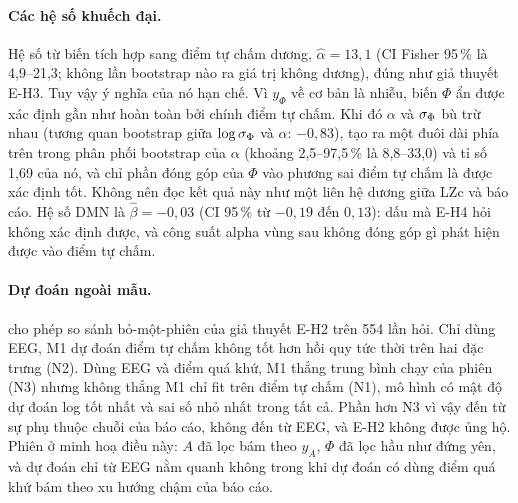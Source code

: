 \paragraph{Các hệ số khuếch đại.} Hệ số từ biến tích hợp sang điểm tự chấm dương, $\hat\alpha=13{,}1$ (CI Fisher 95\,\% là 4,9--21,3; không lần bootstrap nào ra giá trị không dương), đúng như giả thuyết E-H3. Tuy vậy ý nghĩa của nó hạn chế. Vì $y_\Phi$ về cơ bản là nhiễu, biến $\Phi$ ẩn được xác định gần như hoàn toàn bởi chính điểm tự chấm. Khi đó $\alpha$ và $\sigma_{\Phi}$ bù trừ nhau (tương quan bootstrap giữa $\log\sigma_{\Phi}$ và $\alpha$: $-0{,}83$), tạo ra một đuôi dài phía trên trong phân phối bootstrap của $\alpha$ (khoảng 2,5--97,5\,\% là 8,8--33,0) và tỉ số 1,69 của nó, và chỉ phần đóng góp của $\Phi$ vào phương sai điểm tự chấm là được xác định tốt. Không nên đọc kết quả này như một liên hệ dương giữa LZc và báo cáo. Hệ số DMN là $\hat\beta=-0{,}03$ (CI 95\,\% từ $-0{,}19$ đến $0{,}13$): dấu mà E-H4 hỏi không xác định được, và công suất alpha vùng sau không đóng góp gì phát hiện được vào điểm tự chấm.

\paragraph{Dự đoán ngoài mẫu.}  cho phép so sánh bỏ-một-phiên của giả thuyết E-H2 trên 554 lần hỏi. Chỉ dùng EEG, M1 dự đoán điểm tự chấm không tốt hơn hồi quy tức thời trên hai đặc trưng (N2). Dùng EEG và điểm quá khứ, M1 thắng trung bình chạy của phiên (N3) nhưng không thắng M1 chỉ fit trên điểm tự chấm (N1), mô hình có mật độ dự đoán log tốt nhất và sai số nhỏ nhất trong tất cả. Phần hơn N3 vì vậy đến từ sự phụ thuộc chuỗi của báo cáo, không đến từ EEG, và E-H2 không được ủng hộ. Phiên ở  minh hoạ điều này: $A$ đã lọc bám theo $y_A$, $\Phi$ đã lọc hầu như đứng yên, và dự đoán chỉ từ EEG nằm quanh không trong khi dự đoán có dùng điểm quá khứ bám theo xu hướng chậm của báo cáo.

